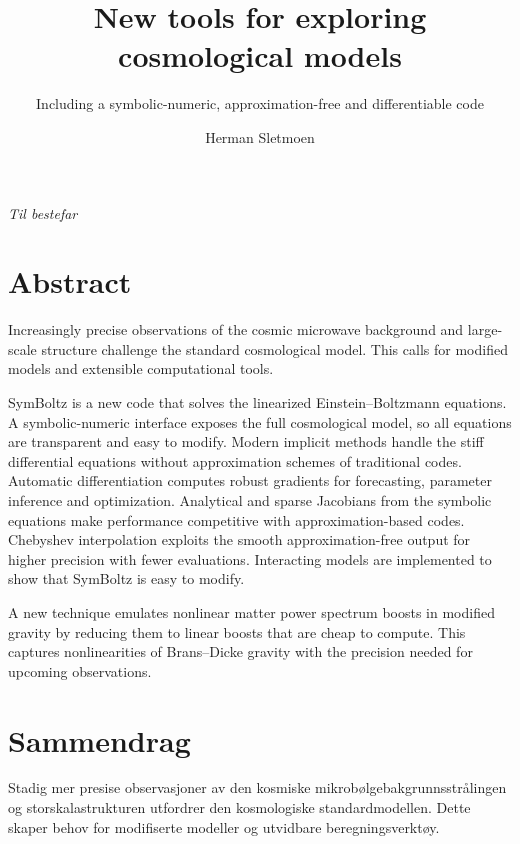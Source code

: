 \documentclass[USenglish, thumbmarks]{uiophdthesis} %
\title{New tools for exploring cosmological models}
\subtitle{Including a symbolic-numeric, approximation-free and differentiable \EB{} code}
\author{Herman Sletmoen}
\newcommand\EB{Einstein--Boltzmann}
\newcommand\BD{Brans--Dicke}
\begin{document}
\frontmatter{}
\maketitle[
    supervisor={Hans A. Winther},
    dept={Institute of Theoretical Astrophysics},
    fac={Faculty of Mathematics and Natural Sciences},
    year={2026}
]

\chapter*{} %
\thispagestyle{empty} %
\begin{flushright}
\textit{Til bestefar}
\end{flushright}

\chapter*{Abstract}
Increasingly precise observations of the cosmic microwave background and large-scale structure
challenge the standard cosmological model.
This calls for modified models and extensible computational tools.

SymBoltz is a new code that solves the linearized \EB{} equations.
A symbolic-numeric interface exposes the full cosmological model, so all equations are transparent and easy to modify.
Modern implicit methods handle the stiff differential equations without approximation schemes of traditional codes.
Automatic differentiation computes robust gradients for forecasting, parameter inference and optimization.
Analytical and sparse Jacobians from the symbolic equations
make performance competitive with approximation-based codes.
Chebyshev interpolation exploits the smooth approximation-free output
for higher precision with fewer evaluations.
Interacting models are implemented to show that SymBoltz is easy to modify.

A new technique emulates nonlinear matter power spectrum boosts in modified gravity
by reducing them to linear boosts that are cheap to compute.
This captures nonlinearities of \BD{} gravity with the precision needed for upcoming observations.

\chapter*{Sammendrag}
Stadig mer presise observasjoner av den kosmiske mikrobølgebakgrunnsstrålingen og storskalastrukturen
utfordrer den kosmologiske standardmodellen.
Dette skaper behov for modifiserte modeller og utvidbare beregningsverktøy.
\end{document}
